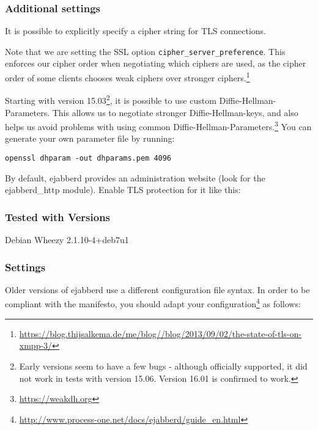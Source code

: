 \subsubsection{Additional settings}
It is possible to explicitly specify a cipher string for TLS connections.

Note that we are setting the SSL option \texttt{cipher\_server\_preference}. This enforces our cipher order when negotiating which ciphers are used, as the cipher order of some clients chooses weak ciphers over stronger ciphers.\footnote{\url{https://blog.thijsalkema.de/me/blog//blog/2013/09/02/the-state-of-tls-on-xmpp-3/}}

Starting with version 15.03\footnote{Early versions seem to have a few bugs - although officially supported, it did not work in tests with version 15.06. Version 16.01 is confirmed to work.}, it is possible to use custom Diffie-Hellman-Parameters. This allows us to negotiate stronger Diffie-Hellman-keys, and also helps us avoid problems with using common Diffie-Hellman-Parameters.\footnote{\url{https://weakdh.org}} You can generate your own parameter file by running:
\begin{lstlisting}
openssl dhparam -out dhparams.pem 4096
\end{lstlisting}

By default, ejabberd provides an administration website (look for the ejabberd\_http module). Enable TLS protection for it like this:


\subsubsection{Tested with Versions}
\begin{itemize*}
\item Debian Wheezy 2.1.10-4+deb7u1
\end{itemize*}
\subsubsection{Settings}
Older versions of ejabberd use a different configuration file syntax.
In order to be compliant with the manifesto, you should adapt your configuration\footnote{\url{http://www.process-one.net/docs/ejabberd/guide_en.html}} as follows:
%
